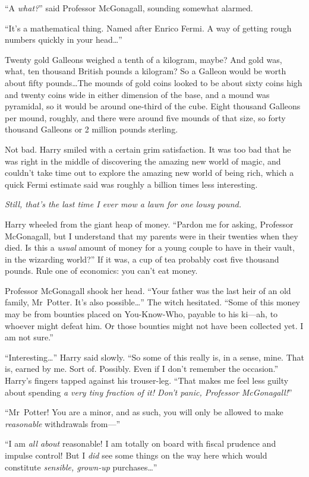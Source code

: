 “A \emph{what?}” said Professor McGonagall, sounding somewhat alarmed.

“It’s a mathematical thing. Named after Enrico Fermi. A way of getting rough numbers quickly in your head…”

Twenty gold Galleons weighed a tenth of a kilogram, maybe? And gold was, what, ten thousand British pounds a kilogram? So a Galleon would be worth about fifty pounds…The mounds of gold coins looked to be about sixty coins high and twenty coins wide in either dimension of the base, and a mound was pyramidal, so it would be around one-third of the cube. Eight thousand Galleons per mound, roughly, and there were around five mounds of that size, so forty thousand Galleons or 2 million pounds sterling.

Not bad. Harry smiled with a certain grim satisfaction. It was too bad that he was right in the middle of discovering the amazing new world of magic, and couldn’t take time out to explore the amazing new world of being rich, which a quick Fermi estimate said was roughly a billion times less interesting.

\emph{Still, that’s the last time I ever mow a lawn for one lousy pound.}

Harry wheeled from the giant heap of money. “Pardon me for asking, Professor McGonagall, but I understand that my parents were in their twenties when they died. Is this a \emph{usual} amount of money for a young couple to have in their vault, in the wizarding world?” If it was, a cup of tea probably cost five thousand pounds. Rule one of economics: you can’t eat money.

Professor McGonagall shook her head. “Your father was the last heir of an old family, Mr~Potter. It’s also possible…” The witch hesitated. “Some of this money may be from bounties placed on You-Know-Who, payable to his ki---ah, to whoever might defeat him. Or those bounties might not have been collected yet. I am not sure.”

“Interesting…” Harry said slowly. “So some of this really is, in a sense, mine. That is, earned by me. Sort of. Possibly. Even if I don’t remember the occasion.” Harry’s fingers tapped against his trouser-leg. “That makes me feel less guilty about spending \emph{a very tiny fraction of it! Don’t panic, Professor McGonagall!}”

“Mr~Potter! You are a minor, and as such, you will only be allowed to make \emph{reasonable} withdrawals from---”

“I am \emph{all about} reasonable! I am totally on board with fiscal prudence and impulse control! But I \emph{did} see some things on the way here which would constitute \emph{sensible, grown-up} purchases…”

